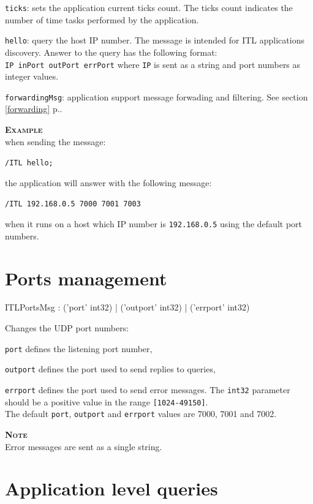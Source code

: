 \documentclass[a4paper,twoside]{report}
\newcommand{\sublevel}[1]	{\section{#1}}
\newcommand{\fullref}[1]	{\ref{#1} p.\pageref{#1}}
\newcommand{\OSC}[1]		{\texttt{#1}}
\newcommand{\values}[1]		{\texttt{#1}}
\newcommand{\oldexample}	{\hspace*{1cm}}
\newcommand{\example}		{\textbf{\hspace{-1.5cm}\textbf{\textsc{Example }}}}
\newcommand{\note}	[1]		{\vspace{2mm}\textbf{\hspace{-1.03cm}\textbf{\textsc{Note #1}}}}
\let\olditemize\itemize
\let\oldenditemize\enditemize
\renewenvironment{itemize} 	{\olditemize \setlength{\itemsep}{1mm}}{\oldenditemize}
\newcommand{\sample}	[1]			{\vspace{-2mm}\begin{center}\colorbox{mygrey}{
								\begin{minipage}[t]{0.9\columnwidth} 
								{\small \texttt{#1}}
								\end{minipage}}\end{center}}
\newcommand{\sampleindent}	{ \hspace{0.5cm} }
\begin{document}
\begin{itemize}
\item \OSC{ticks}: sets the application current ticks count. The ticks count indicates the number of time tasks performed by the application.

\item \OSC{hello}: query the host IP number. The message is intended for ITL applications discovery. Answer to the query has the following format: \\
\oldexample \OSC{IP  inPort outPort errPort} where \OSC{IP} is sent as a string and port numbers as integer values.

\item \OSC{forwardingMsg}: application support message forwading and filtering. See section \fullref{forwarding}.
\end{itemize}

\example \\
when sending the message:
\sample{/ITL hello;}
\sampleindent the application will answer with the following message:
\sample{/ITL 192.168.0.5  7000 7001 7003}
\sampleindent when it runs on a host which IP number is \OSC{192.168.0.5} using the default port numbers.

\sublevel{Ports management}
\label{ITLPorts}

\begin{rail}
ITLPortsMsg : ('port' int32)
		| ('outport' int32)
		| ('errport' int32)
\end{rail}

Changes the UDP port numbers:
\begin{itemize}
\item \OSC{port} defines the listening port number, 
\item \OSC{outport} defines the port used to send replies to queries, 
\item \OSC{errport} defines the port used to send error messages. 
\end{itemize}
The \OSC{int32} parameter should be a positive value in the range \values{[1024-49150]}. \\
The default \OSC{port}, \OSC{outport} and \OSC{errport} values are 7000, 7001 and 7002.

\note{} \\
Error messages are sent as a single string.

\sublevel{Application level queries}
\label{ITLQuery}
\end{document}
